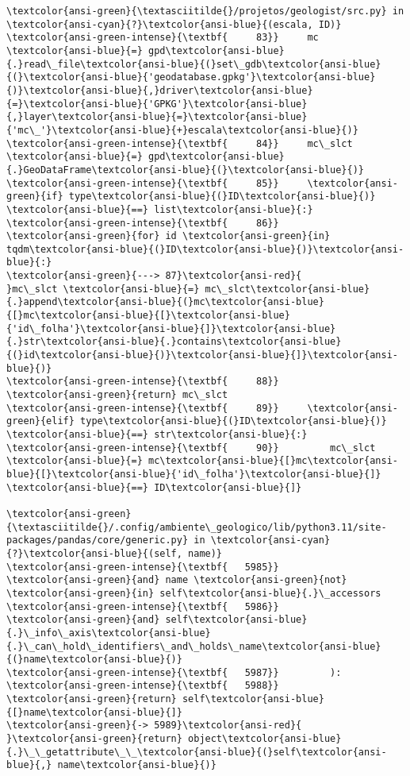 \documentclass[11pt]{article}
\begin{document}
\begin{Verbatim}[commandchars=\\\{\}, frame=single, framerule=2mm, rulecolor=\color{outerrorbackground}]
\textcolor{ansi-green}{\textasciitilde{}/projetos/geologist/src.py} in \textcolor{ansi-cyan}{?}\textcolor{ansi-blue}{(escala, ID)}
\textcolor{ansi-green-intense}{\textbf{     83}}     mc \textcolor{ansi-blue}{=} gpd\textcolor{ansi-blue}{.}read\_file\textcolor{ansi-blue}{(}set\_gdb\textcolor{ansi-blue}{(}\textcolor{ansi-blue}{'geodatabase.gpkg'}\textcolor{ansi-blue}{)}\textcolor{ansi-blue}{,}driver\textcolor{ansi-blue}{=}\textcolor{ansi-blue}{'GPKG'}\textcolor{ansi-blue}{,}layer\textcolor{ansi-blue}{=}\textcolor{ansi-blue}{'mc\_'}\textcolor{ansi-blue}{+}escala\textcolor{ansi-blue}{)}
\textcolor{ansi-green-intense}{\textbf{     84}}     mc\_slct \textcolor{ansi-blue}{=} gpd\textcolor{ansi-blue}{.}GeoDataFrame\textcolor{ansi-blue}{(}\textcolor{ansi-blue}{)}
\textcolor{ansi-green-intense}{\textbf{     85}}     \textcolor{ansi-green}{if} type\textcolor{ansi-blue}{(}ID\textcolor{ansi-blue}{)} \textcolor{ansi-blue}{==} list\textcolor{ansi-blue}{:}
\textcolor{ansi-green-intense}{\textbf{     86}}         \textcolor{ansi-green}{for} id \textcolor{ansi-green}{in} tqdm\textcolor{ansi-blue}{(}ID\textcolor{ansi-blue}{)}\textcolor{ansi-blue}{:}
\textcolor{ansi-green}{---> 87}\textcolor{ansi-red}{             }mc\_slct \textcolor{ansi-blue}{=} mc\_slct\textcolor{ansi-blue}{.}append\textcolor{ansi-blue}{(}mc\textcolor{ansi-blue}{[}mc\textcolor{ansi-blue}{[}\textcolor{ansi-blue}{'id\_folha'}\textcolor{ansi-blue}{]}\textcolor{ansi-blue}{.}str\textcolor{ansi-blue}{.}contains\textcolor{ansi-blue}{(}id\textcolor{ansi-blue}{)}\textcolor{ansi-blue}{]}\textcolor{ansi-blue}{)}
\textcolor{ansi-green-intense}{\textbf{     88}}         \textcolor{ansi-green}{return} mc\_slct
\textcolor{ansi-green-intense}{\textbf{     89}}     \textcolor{ansi-green}{elif} type\textcolor{ansi-blue}{(}ID\textcolor{ansi-blue}{)} \textcolor{ansi-blue}{==} str\textcolor{ansi-blue}{:}
\textcolor{ansi-green-intense}{\textbf{     90}}         mc\_slct \textcolor{ansi-blue}{=} mc\textcolor{ansi-blue}{[}mc\textcolor{ansi-blue}{[}\textcolor{ansi-blue}{'id\_folha'}\textcolor{ansi-blue}{]} \textcolor{ansi-blue}{==} ID\textcolor{ansi-blue}{]}

\textcolor{ansi-green}{\textasciitilde{}/.config/ambiente\_geologico/lib/python3.11/site-packages/pandas/core/generic.py} in \textcolor{ansi-cyan}{?}\textcolor{ansi-blue}{(self, name)}
\textcolor{ansi-green-intense}{\textbf{   5985}}             \textcolor{ansi-green}{and} name \textcolor{ansi-green}{not} \textcolor{ansi-green}{in} self\textcolor{ansi-blue}{.}\_accessors
\textcolor{ansi-green-intense}{\textbf{   5986}}             \textcolor{ansi-green}{and} self\textcolor{ansi-blue}{.}\_info\_axis\textcolor{ansi-blue}{.}\_can\_hold\_identifiers\_and\_holds\_name\textcolor{ansi-blue}{(}name\textcolor{ansi-blue}{)}
\textcolor{ansi-green-intense}{\textbf{   5987}}         ):
\textcolor{ansi-green-intense}{\textbf{   5988}}             \textcolor{ansi-green}{return} self\textcolor{ansi-blue}{[}name\textcolor{ansi-blue}{]}
\textcolor{ansi-green}{-> 5989}\textcolor{ansi-red}{         }\textcolor{ansi-green}{return} object\textcolor{ansi-blue}{.}\_\_getattribute\_\_\textcolor{ansi-blue}{(}self\textcolor{ansi-blue}{,} name\textcolor{ansi-blue}{)}


\end{Verbatim}
\end{document}
